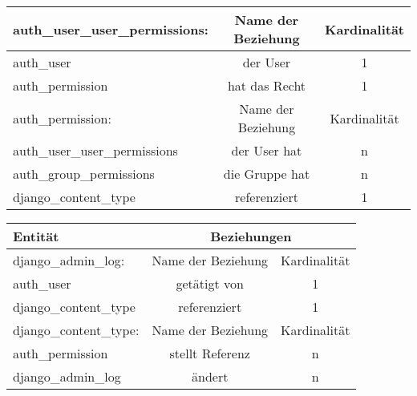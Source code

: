 \begin{tabular}[ht]{|l||c|c|}
  auth\_user\_user\_permissions:  & Name der Beziehung &  Kardinalit\"at\\
  \hline\hline
  auth\_user & der User & 1 \\
  \hline
  auth\_permission & hat das Recht & 1 \\
  \hline\hline\hline 
  
  auth\_permission:  & Name der Beziehung &  Kardinalit\"at\\
  \hline\hline
  auth\_user\_user\_permissions & der User hat  & n \\
  \hline
  auth\_group\_permissions & die Gruppe hat & n \\
  \hline
  django\_content\_type & referenziert & 1 \\
  \hline
\end{tabular}

\begin{tabular}[ht]{|l||c|c|}
  \hline
  Entit\"at & \multicolumn{2}{c|}{Beziehungen} \\
  \hline\hline\hline
  
  django\_admin\_log:  & Name der Beziehung &  Kardinalit\"at\\
  \hline\hline
  auth\_user & getätigt von  & 1 \\
  \hline
  django\_content\_type & referenziert & 1 \\
  \hline\hline\hline
  
  django\_content\_type:  & Name der Beziehung &  Kardinalit\"at\\
  \hline\hline
  auth\_permission & stellt Referenz  & n \\
  \hline
  django\_admin\_log & ändert & n \\
  \hline\hline\hline
\end{tabular}

